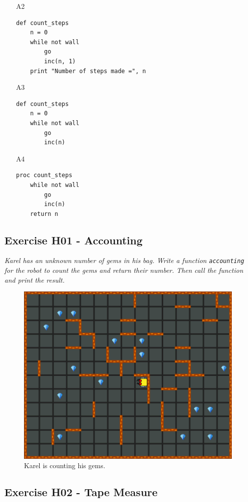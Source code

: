 {{{{\begin{enumerate}
\begin{enumerate}
\begin{verbatim}
\end{verbatim}
\item[A2] 
\begin{verbatim}
def count_steps
    n = 0
    while not wall
        go
        inc(n, 1)
    print "Number of steps made =", n
\end{verbatim}
\item[A3] 
\begin{verbatim}
def count_steps
    n = 0
    while not wall
        go
        inc(n)
\end{verbatim}
\item[A4] 
\begin{verbatim}
proc count_steps
    while not wall
        go
        inc(n)
    return n
\end{verbatim}
\end{enumerate}
\end{enumerate}

\subsection{Exercise H01 - Accounting}

{\em Karel has an unknown number of gems in his bag. Write a function {\tt accounting} for the 
robot to count the gems and return their number. Then call the function and print the result.}

\begin{figure}[!ht]
\begin{center}
\includegraphics[height=0.4\textwidth]{imgk/h01.png}
\end{center}
\vspace{-4mm}
\caption{Karel is counting his gems.}
\label{fig:h01}
\vspace{-4mm}
\end{figure}
\newpage
\noindent

\subsection{Exercise H02 - Tape Measure}

}}}}
